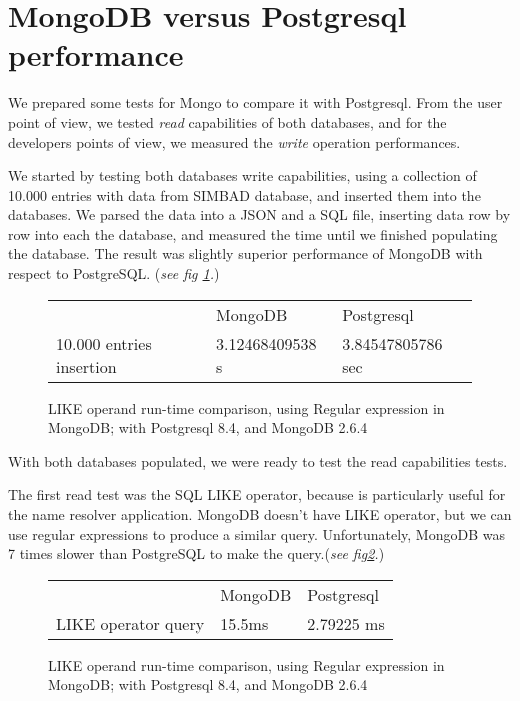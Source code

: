 \documentclass[11pt,twoside]{article}
\begin{document}
\section{MongoDB versus Postgresql performance}
    We prepared some tests for Mongo to compare it with Postgresql. From the user
    point of view, we tested \emph{read} capabilities of both databases, and
    for the developers points of view, we measured the \emph{write} operation
    performances.
    
    We started by testing both databases write capabilities, using a collection of 10.000 entries with data from SIMBAD database,
    and inserted them into the databases. We parsed the data into a JSON and a SQL file, 
    inserting data row by row into each the database, and measured the time until we 
    finished populating the database. The result was slightly superior
    performance of MongoDB with respect to PostgreSQL. (\emph{see fig \ref{fig:insert}.})
    
 \begin{figure}
    \centering
    \begin{tabular}{lll}    
                        & MongoDB & Postgresql \\
    10.000 entries insertion & 3.12468409538 s  & 3.84547805786 sec
    \end{tabular}
    \caption{LIKE operand run-time comparison, using Regular expression in MongoDB; with Postgresql 8.4, and MongoDB 2.6.4}
    \label{fig:insert}
\end{figure}   
    
    With both databases populated, we were ready to test the read capabilities tests.
    
    The first read test was the SQL LIKE operator, because is particularly
    useful for the name resolver application. 
    MongoDB doesn't have LIKE operator, but we can use regular expressions to
    produce a similar query. Unfortunately, MongoDB was 7 times slower than
    PostgreSQL to make the query.(\emph{see fig\ref{fig:like}.})
\begin{figure}
    \centering
    \begin{tabular}{lll}    
                        & MongoDB & Postgresql \\
    LIKE operator query & 15.5ms  & 2.79225 ms
    \end{tabular}
    \caption{LIKE operand run-time comparison, using Regular expression in MongoDB; with Postgresql 8.4, and MongoDB 2.6.4}
    \label{fig:like}
\end{figure}
\end{document}
